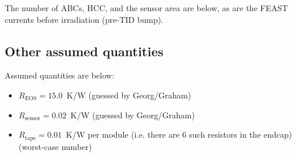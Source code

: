 The number of ABCs, HCC, and the sensor area are below,
as are the FEAST currents before irradiation (pre-TID bump).
%
\let\arraystretcha\arraystretch
\renewcommand\arraystretch{1.1} %
\begin{table}[h]
\footnotesize
\begin{center}
\end{center}
\caption{Endcap module inputs. The FEAST current is calculated from the HCC and ABC values in
Table~\ref{tab:power_numbers}, and given nABC and nHCC in each module. The FEAST power is calculated
assuming a 75\% efficiency, and does not include the power due to the AMAC regulators.}
\label{tab:spurious_signal_main}
\end{table}
\let\arraystretch\arraystretcha


\subsection{Other assumed quantities}

Assumed quantities are below:
\begin{itemize}
\item $R_\text{EOS}=15.0$~K/W (guessed by Georg/Graham)
\item $R_\text{sensor}=0.02$~K/W (guessed by Georg/Graham)
\item $R_\text{tape}=0.01$~K/W per module (i.e. there are 6 such resistors in the endcap) (worst-case number)
\end{itemize}

